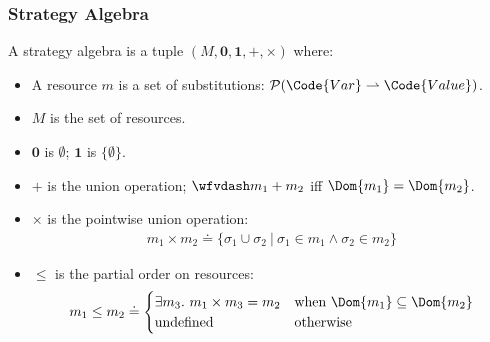 \begin{frame}[fragile]
    \frametitle{Strategy Algebra}

\begin{definition} A strategy algebra is a tuple $(M, \mathbf{0}, \mathbf{1}, +, \times)$ where:
    \begin{itemize}
        \item A resource $m$ is a set of substitutions: $\mathcal{P}(\Code{Var} \rightharpoonup \Code{Value})$.
        \item $M$ is the set of resources.
        \item $\mathbf{0}$ is $\emptyset$; $\mathbf{1}$ is $\{\emptyset\}$.
        \item $+$ is the union operation; $\wfvdash m_1 + m_2$ iff $\Dom{m_1} = \Dom{m_2}$.
        \item $\times$ is the pointwise union operation:
        \begin{align*}
        m_1 \times m_2 \doteq \{ \sigma_1 \cup \sigma_2 ~|~ \sigma_1 \in m_1 \land \sigma_2 \in m_2 \}
        \end{align*}
        \item $\leq$ is the partial order on resources:
        \begin{align*}
        m_1 \leq m_2 \doteq
        \begin{cases}
            \exists m_3.\ m_1 \times m_3 = m_2 & \text{when } \Dom{m_1} \subseteq \Dom{m_2} \\
            \text{undefined} & \text{otherwise}
        \end{cases}
        \end{align*}
    \end{itemize}
\end{definition}
    
\end{frame}

